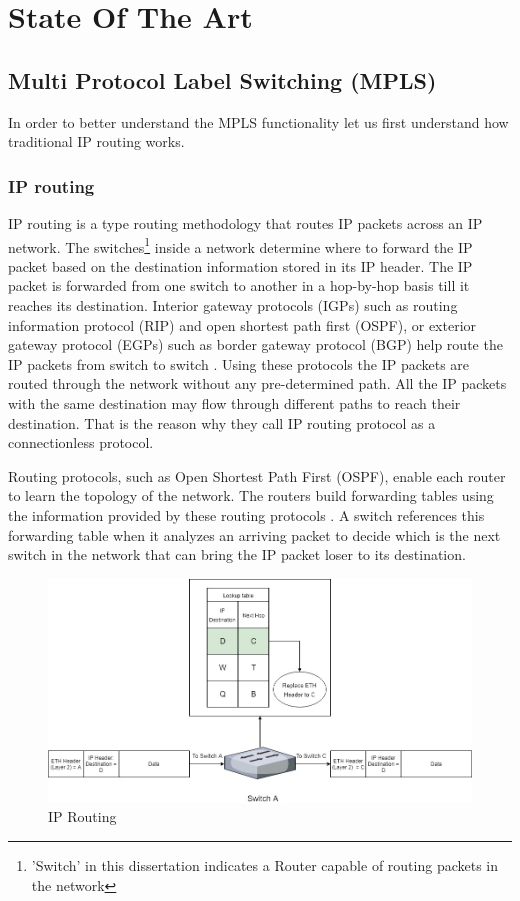 \chapter{State Of The Art}

\section{Multi Protocol Label Switching (MPLS)}
In order to better understand the MPLS functionality let us first understand how traditional IP routing works.
\subsection{IP routing}
IP routing is a type routing methodology that routes IP packets across an IP network. The switches\footnote{'Switch' in this dissertation indicates a Router capable of routing packets in the network} inside a network determine where to forward the IP packet based on the destination information stored in its IP header. The IP packet is forwarded from one switch to another in a hop-by-hop basis till it reaches its destination. Interior gateway protocols (IGPs) such as routing information protocol (RIP) and open shortest path first (OSPF), or exterior gateway protocol (EGPs) such as border gateway protocol (BGP) help route the IP packets from switch to switch \cite{pise2005packet}. Using these protocols the IP packets are routed through the network without any pre-determined path. All the IP packets with the same destination may flow through different paths to reach their destination. That is the reason why they call IP routing protocol as a connectionless protocol.
	
Routing protocols, such as Open Shortest Path First (OSPF), enable each router to learn the topology of the network. The routers build forwarding tables using the information provided by these routing protocols \cite{pise2005packet}. A switch references this forwarding table when it analyzes an arriving packet to decide which is the next switch in the network that can bring the IP packet loser to its destination.
    
\begin{figure}[H]
       \centering\includegraphics[width=\textwidth]{images/1_IPRouting.jpg}
       \caption{IP Routing}
       \label{fig:compbest}
\end{figure}
    
